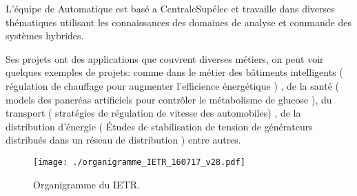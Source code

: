 L'équipe de Automatique est basé a CentraleSupélec et travaille dans diverses thématiques utilisant les connaissances des domaines de analyse et commande des systèmes hybrides.

Ses projets ont des applications que couvrent diverses métiers, on peut voir quelques exemples de projets: comme dans le métier des bâtiments intelligents ( régulation de chauffage pour augmenter l'efficience énergétique )  ,  de la santé ( models des pancréas artificiels pour contrôler le métabolisme de glucose ), du transport ( stratégies de régulation de vitesse des automobiles) , de la distribution d'énergie ( Études de stabilisation de tension de générateurs distribués dans un réseau de distribution ) entre autres.

\vspace{.5cm}
\begin{figure}[H]
	\begin{center}	
		\texttt{[image: ./organigramme\_IETR\_160717\_v28.pdf]}
		\caption{Organigramme du IETR.}
		\label{fig:organigramme_IETR_160717_v28}
	\end{center}
\end{figure}












